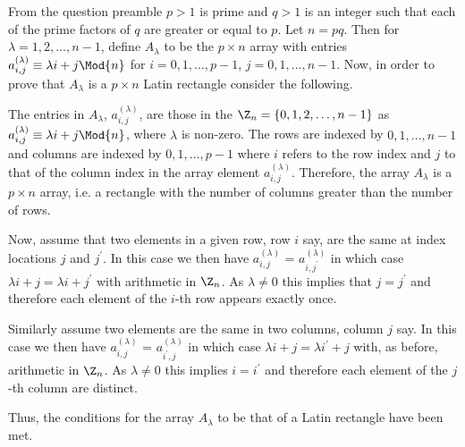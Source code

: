 From the question preamble $p>1$ is prime and $q>1$ is an integer such that each of the prime factors of $q$ are greater or equal to $p$. Let $n=pq$. Then for $\lambda = 1,2,\ldots,n-1$, define $A_\lambda$ to be the $p\times n$ array with entries $a^{(\lambda)}_{i,j}\equiv\lambda i + j\Mod{n}$ for $i=0,1,\ldots,p-1$, $j=0,1,\ldots,n-1$. Now, in order to prove that $A_\lambda$ is a $p\times n$ Latin rectangle consider the following.

The entries in $A_\lambda$, $a^{(\lambda)}_{i,j}$, are those in the $\Z_n = \{0,1,2,\ldots,n-1\}$ as $a^{(\lambda)}_{i,j}\equiv\lambda i + j\Mod{n}$, where $\lambda$ is non-zero. The rows are indexed by $0,1,\ldots,n-1$ and columns are indexed by $0,1,\ldots,p-1$ where $i$ refers to the row index and $j$ to that of the column index in the array element $a^{(\lambda)}_{i,j}$. Therefore, the array $A_\lambda$ is a $p\times n$ array, i.e. a rectangle with the number of columns greater than the number of rows. 

Now, assume that two elements in a given row, row $i$ say, are the same at index locations $j$ and $j^\prime$. In this case we then have $a^{(\lambda)}_{i,j}$ = $a^{(\lambda)}_{i,j^\prime}$ in which case $\lambda i + j = \lambda i + j^\prime$ with arithmetic in $\Z_n$. As $\lambda \not= 0$ this implies that $j=j^\prime$ and therefore each element of the $i$-th row appears exactly once. 

Similarly assume two elements are the same in two columns, column $j$ say. In this case we then have $a^{(\lambda)}_{i,j}$ = $a^{(\lambda)}_{i^\prime,j}$ in which case $\lambda i + j = \lambda i^\prime + j$ with, as before, arithmetic in $\Z_n$. As $\lambda \not= 0$ this implies $i=i^\prime$ and therefore each element of the $j$-th column are distinct. 

Thus, the conditions for the array $A_\lambda$ to be that of a Latin rectangle have been met.
